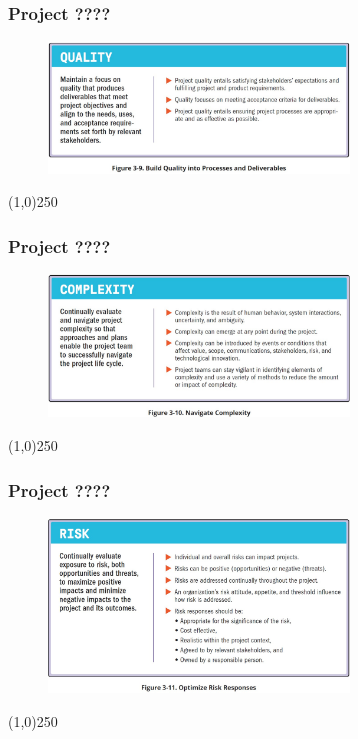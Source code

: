 \begin{frame}
\frametitle{Project ????}
 \begin{figure}
    \centering
        \includegraphics[width = 8cm]{../images/standard/Fig3-9.jpg}
    \label{standardfig:3-9}
 \end{figure}
\end{frame}
\begin{center}\line(1,0){250}\end{center}

\begin{frame}
\frametitle{Project ????}
 \begin{figure}
    \centering
        \includegraphics[width = 8cm]{../images/standard/Fig3-10.jpg}
    \label{standardfig:3-10}
 \end{figure}
\end{frame}
\begin{center}\line(1,0){250}\end{center}

\begin{frame}
\frametitle{Project ????}
 \begin{figure}
    \centering
        \includegraphics[width = 8cm]{../images/standard/Fig3-11.jpg}
    \label{standardfig:3-11}
 \end{figure}
\end{frame}
\begin{center}\line(1,0){250}\end{center}

